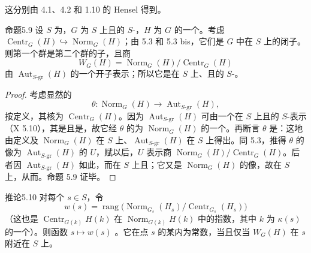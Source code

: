 这分别由 4.1、4.2 和 1.10 的 Hensel 得到。
\begin{SGAresult}{命题}{5.9}
设 $S$ 为，$G$ 为 $S$ 上且的 $S$-，$H$ 为 $G$ 的一个。考虑 $\operatorname{Centr}_G(H)\hookrightarrow\operatorname{Norm}_G(H)$；由 5.3 和 5.3 bis，它们是 $G$ 中在 $S$ 上的闭子。则第一个群是第二个群的子，且商
\[W_G(H)=\operatorname{Norm}_G(H)/\operatorname{Centr}_G(H)\]
由 $\operatorname{Aut}_{S\text{-gr}}(H)$ 的一个开子表示；所以它是在 $S$ 上、且的 $S$-。
\end{SGAresult}
\begin{proof}
考虑显然的
\[\theta:\operatorname{Norm}_G(H)\longrightarrow\operatorname{Aut}_{S\text{-gr}}(H),\]
按定义，其核为 $\operatorname{Centr}_G(H)$。因为 $\operatorname{Aut}_{S\text{-gr}}(H)$ 可由一个在 $S$ 上且的 $S$-表示（X 5.10），其是且是，故它经 $\theta$ 的为 $\operatorname{Norm}_G(H)$ 的一个。再断言 $\theta$ 是：这地由定义及 $\operatorname{Norm}_G(H)$ 在 $S$ 上、$\operatorname{Aut}_{S\text{-gr}}(H)$ 在 $S$ 上得出。同 5.3，推得 $\theta$ 的像为 $\operatorname{Aut}_{S\text{-gr}}(H)$ 的 $U$，赋以后，$U$ 表示商 $\operatorname{Norm}_G(H)/\operatorname{Centr}_G(H)$。后者因 $\operatorname{Aut}_{S\text{-gr}}(H)$ 如此，而在 $S$ 上且；它又是 $\operatorname{Norm}_G(H)$ 的像，故在 $S$ 上，从而。命题 5.9 证毕。
\end{proof}
\begin{SGAresult}{推论}{5.10}
对每个 $s\in S$，令
\[w(s)=\operatorname{rang}\bigl(\operatorname{Norm}_{G_s}(H_s)/\operatorname{Centr}_{G_s}(H_s)\bigr)\]
（这也是 $\operatorname{Centr}_{G(k)}H(k)$ 在 $\operatorname{Norm}_{G(k)}H(k)$ 中的指数，其中 $k$ 为 $\kappa(s)$ 的一个）。则函数 $s\mapsto w(s)$ 。它在点 $s$ 的某内为常数，当且仅当 $W_G(H)$ 在 $s$ 附近在 $S$ 上。
\end{SGAresult}
